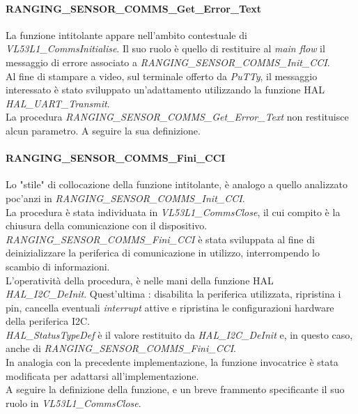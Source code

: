 \documentclass[11pt]{report}
\begin{document}
\paragraph{RANGING\_SENSOR\_COMMS\_Get\_Error\_Text}
La funzione intitolante appare nell'ambito contestuale di \textit{VL53L1\_CommsInitialise}. Il suo ruolo è quello di restituire al \textit{main flow} il messaggio di errore associato a \textit{RANGING\_SENSOR\_COMMS\_Init\_CCI}.\\
Al fine di stampare a video, sul terminale offerto da \textit{PuTTy}, il messaggio interessato è stato sviluppato un'adattamento utilizzando la funzione HAL \textit{HAL\_UART\_Transmit}.\\
La procedura \textit{RANGING\_SENSOR\_COMMS\_Get\_Error\_Text} non restituisce alcun parametro.
A seguire la sua definizione.

\paragraph{RANGING\_SENSOR\_COMMS\_Fini\_CCI}
Lo "stile" di collocazione della funzione intitolante, è analogo a quello analizzato poc'anzi in \textit{RANGING\_SENSOR\_COMMS\_Init\_CCI}.\\
La procedura è stata individuata in \textit{VL53L1\_CommsClose}, il cui compito è la chiusura della comunicazione con il dispositivo.\\
\textit{RANGING\_SENSOR\_COMMS\_Fini\_CCI} è stata sviluppata al fine di deinizializzare la periferica di comunicazione in utilizzo, interrompendo lo scambio di informazioni.\\
L'operatività della procedura, è nelle mani della funzione HAL \textit{HAL\_I2C\_DeInit}. Quest'ultima : disabilita la periferica utilizzata, ripristina i pin, cancella eventuali \textit{interrupt} attive e ripristina le configurazioni hardware della periferica I2C.\\
\textit{HAL\_StatusTypeDef} è il valore restituito da \textit{HAL\_I2C\_DeInit} e, in questo caso, anche di \textit{RANGING\_SENSOR\_COMMS\_Fini\_CCI}.\\
In analogia con la precedente implementazione, la funzione invocatrice è stata modificata per adattarsi all'implementazione.\\
A seguire la definizione della funzione, e un breve frammento specificante il suo ruolo in \textit{VL53L1\_CommsClose}.

\end{document}
